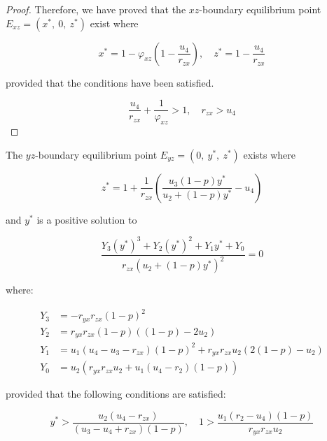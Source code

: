 \begin{proof}
    Therefore, we have proved that the $xz$-boundary equilibrium point $E_{xz}=\left(x^*,\ 0,\ z^*\right)$ exist where 
    
    \begin{equation*}
        x^*=1-\varphi_{xz}\left(1-\frac{u_4}{r_{zx}}\right),\quad z^*=1-\frac{u_4}{r_{zx}}
    \end{equation*}
    
    provided that the conditions have been satisfied.
    
    \begin{equation*}
        \frac{u_4}{r_{zx}}+\frac{1}{\varphi_{xz}} > 1,\quad 
        r_{zx}>u_4
    \end{equation*}
\end{proof}

\begin{theorem}\label{thm:eq-boundary-yz-exist}
    The $yz$-boundary equilibrium point $E_{yz}=\left(0,\ y^*,\ z^*\right)$ exists where
    
    \begin{equation*}
        z^*=1+\frac{1}{r_{zx}}\left(\frac{u_3\left(1-p\right)y^*}{u_2+\left(1-p\right)y^*}-u_4\right)
    \end{equation*}

    and $y^*$ is a positive solution to 

    \begin{equation*}
        \frac{Y_3\left(y^*\right)^3+Y_2\left(y^*\right)^2+Y_1y^*+Y_0}{r_{zx}\left(u_2+\left(1-p\right)y^*\right)^2}=0
    \end{equation*}

    where:

    \begin{align*}
        Y_3 &= -r_{yx}r_{zx}\left(1-p\right)^2\\
        Y_2 &= r_{yx}r_{zx}\left(1-p\right)\left(\left(1-p\right)-2u_2\right)\\
        Y_1 &= u_1\left(u_4-u_3-r_{zx}\right)\left(1-p\right)^2+r_{yx}r_{zx}u_2\left(2\left(1-p\right)-u_2\right)\\
        Y_0 &= u_2\left(r_{yx}r_{zx}u_2+u_1\left(u_4-r_2\right)\left(1-p\right)\right)
    \end{align*}

    provided that the following conditions are satisfied:
    
    \begin{equation*}
        y^* > \frac{u_2\left(u_4-r_{zx}\right)}{\left(u_3-u_4+r_{zx}\right)\left(1-p\right)},\quad 
        1 > \frac{u_1\left(r_2-u_4\right)\left(1-p\right)}{r_{yx}r_{zx}u_2}
    \end{equation*}
\end{theorem}
